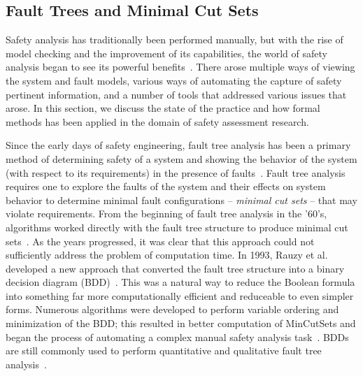 \subsection{Fault Trees and Minimal Cut Sets}
\label{sec:saArtifacts}
 Safety analysis has traditionally been performed manually, but with the rise of model checking and the improvement of its capabilities, the world of safety analysis began to see its powerful benefits~\cite{hinchey2012industrial, liggesmeyer1998improving, coudert1993fault, Bozzano:2010:DSA:1951720,bozzano2003esacs}. There arose multiple ways of viewing the system and fault models, various ways of automating the capture of safety pertinent information, and a number of tools that addressed various issues that arose. In this section, we discuss the state of the practice and how formal methods has been applied in the domain of safety assessment research.

Since the early days of safety engineering, fault tree analysis has been a primary method of determining safety of a system and showing the behavior of the system (with respect to its requirements) in the presence of faults~\cite{0f356f05e72f43018211b36f97c8854a,vesely1981fault}. Fault tree analysis requires one to explore the faults of the system and their effects on system behavior to determine minimal fault configurations -- \emph{minimal cut sets} -- that may violate requirements. From the beginning of fault tree analysis in the '60's, algorithms worked directly with the fault tree structure to produce minimal cut sets~\cite{10020219108,semanderes1971elraft}. As the years progressed, it was clear that this approach could not sufficiently address the problem of computation time. In 1993, Rauzy et al. developed a new approach that converted the fault tree structure into a binary decision diagram (BDD)~\cite{rauzy1993new}. This was a natural way to reduce the Boolean formula into something far more computationally efficient and reduceable to even simpler forms. Numerous algorithms were developed to perform variable ordering and minimization of the BDD; this resulted in better computation of MinCutSets and began the process of automating a complex manual safety analysis task~\cite{sinnamon1997new,bryant1986graph,aralia1996computation,reay2002fault,rauzy2007assessment}. BDDs are still commonly used to perform quantitative and qualitative fault tree analysis~\cite{ge2015quantitative,jiang2018algebraic,banov2019new}.

